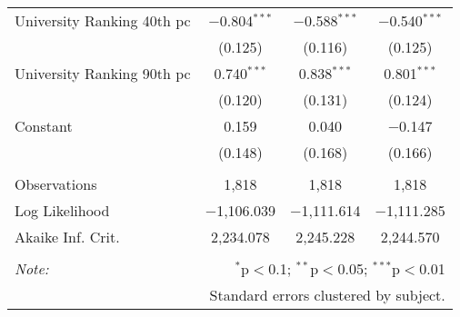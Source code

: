 \begin{table}[!htbp]
\begin{tabular}{@{\extracolsep{5pt}}lccc}
  University Ranking 40th pc & $-$0.804$^{***}$ & $-$0.588$^{***}$ & $-$0.540$^{***}$ \\ 
  & (0.125) & (0.116) & (0.125) \\ 
  University Ranking 90th pc & 0.740$^{***}$ & 0.838$^{***}$ & 0.801$^{***}$ \\ 
  & (0.120) & (0.131) & (0.124) \\ 
  Constant & 0.159 & 0.040 & $-$0.147 \\ 
  & (0.148) & (0.168) & (0.166) \\ 
 \hline \\[-1.8ex] 
Observations & 1,818 & 1,818 & 1,818 \\ 
Log Likelihood & $-$1,106.039 & $-$1,111.614 & $-$1,111.285 \\ 
Akaike Inf. Crit. & 2,234.078 & 2,245.228 & 2,244.570 \\ 
\hline 
\hline \\[-1.8ex] 
\textit{Note:}  & \multicolumn{3}{r}{$^{*}$p$<$0.1; $^{**}$p$<$0.05; $^{***}$p$<$0.01} \\ 
 & \multicolumn{3}{r}{Standard errors clustered by subject.} \\ 
\end{tabular} 
\end{table} 
